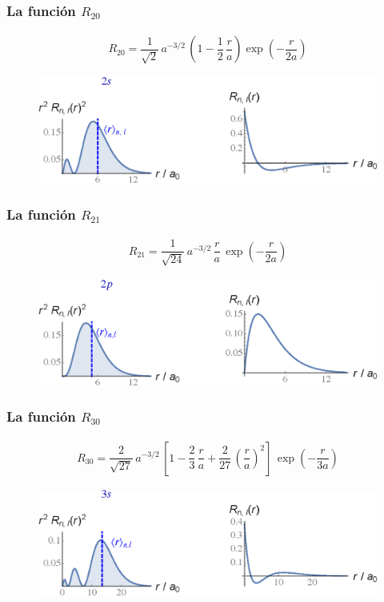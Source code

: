 \begin{frame}
\frametitle{La función $R_{20}$}
\begin{align*}
R_{20} = \dfrac{1}{\sqrt{2}} \, a^{-3/2} \, \left( 1 - \dfrac{1}{2} \, \dfrac{r}{a} \right)\exp(-\dfrac{r}{2a})
\end{align*}
\pause
\vspace*{-0.5cm}
\begin{figure}
   \centering
   \includegraphics[scale=0.67]{Imagenes/Plot_Funcion_Radial_20.eps}
\end{figure}
\end{frame}
\begin{frame}
\frametitle{La función $R_{21}$}
\begin{align*}
R_{21} = \dfrac{1}{\sqrt{24}} \, a^{-3/2} \, \dfrac{r}{a} \, \exp(-\dfrac{r}{2a})
\end{align*}
\pause
\vspace*{-0.5cm}
\begin{figure}
   \centering
   \includegraphics[scale=0.67]{Imagenes/Plot_Funcion_Radial_21.eps}
\end{figure}
\end{frame}
\begin{frame}
\frametitle{La función $R_{30}$}
\begin{align*}
R_{30} = \dfrac{2}{\sqrt{27}} \, a^{-3/2} \, \left[ 1 {-} \dfrac{2}{3} \, \dfrac{r}{a} {+} \dfrac{2}{27} \, \left( \dfrac{r}{a} \right)^{2} \right] \, \exp(-\dfrac{r}{3a})
\end{align*}
\pause
\vspace*{-0.5cm}
\begin{figure}
   \centering
   \includegraphics[scale=0.67]{Imagenes/Plot_Funcion_Radial_30.eps}
\end{figure}
\end{frame}
